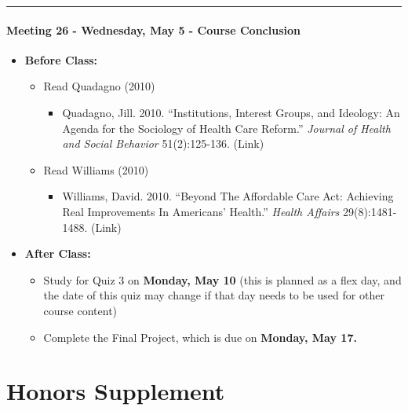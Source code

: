 \documentclass[
]{book}
\providecommand{\tightlist}{%
  \setlength{\itemsep}{0pt}\setlength{\parskip}{0pt}}
\begin{document}
\begin{center}\rule{0.5\linewidth}{0.5pt}\end{center}

\hypertarget{meeting-26---wednesday-may-5---course-conclusion}{%
\subsection*{Meeting 26 - Wednesday, May 5 - Course Conclusion}\label{meeting-26---wednesday-may-5---course-conclusion}}

\begin{itemize}
\tightlist
\item
  \textbf{Before Class:}

  \begin{itemize}
  \tightlist
  \item
    Read Quadagno (2010)

    \begin{itemize}
    \tightlist
    \item
      Quadagno, Jill. 2010. ``Institutions, Interest Groups, and Ideology: An Agenda for the Sociology of Health Care Reform.'' \emph{Journal of Health and Social Behavior} 51(2):125-136. (Link)
    \end{itemize}
  \item
    Read Williams (2010)

    \begin{itemize}
    \tightlist
    \item
      Williams, David. 2010. ``Beyond The Affordable Care Act: Achieving Real Improvements In Americans' Health.'' \emph{Health Affairs} 29(8):1481-1488. (Link)
    \end{itemize}
  \end{itemize}
\item
  \textbf{After Class:}

  \begin{itemize}
  \tightlist
  \item
    Study for Quiz 3 on \textbf{Monday, May 10} (this is planned as a flex day, and the date of this quiz may change if that day needs to be used for other course content)
  \item
    Complete the Final Project, which is due on \textbf{Monday, May 17.}
  \end{itemize}
\end{itemize}

\hypertarget{part-honors-supplement}{%
\part{Honors Supplement}\label{part-honors-supplement}}
\end{document}
